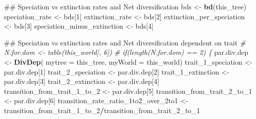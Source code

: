 \documentclass[]{book}
\newenvironment{Shaded}{\begin{snugshade}}{\end{snugshade}}
\newcommand{\KeywordTok}[1]{\textcolor[rgb]{0.13,0.29,0.53}{\textbf{{#1}}}}
\newcommand{\DataTypeTok}[1]{\textcolor[rgb]{0.13,0.29,0.53}{{#1}}}
\newcommand{\DecValTok}[1]{\textcolor[rgb]{0.00,0.00,0.81}{{#1}}}
\newcommand{\StringTok}[1]{\textcolor[rgb]{0.31,0.60,0.02}{{#1}}}
\newcommand{\CommentTok}[1]{\textcolor[rgb]{0.56,0.35,0.01}{\textit{{#1}}}}
\newcommand{\OperatorTok}[1]{\textcolor[rgb]{0.81,0.36,0.00}{\textbf{{#1}}}}
\newcommand{\NormalTok}[1]{{#1}}
\theoremstyle{definition}
\theoremstyle{definition}
\theoremstyle{remark}
\begin{document}
\begin{Shaded}
\begin{Highlighting}[]
\NormalTok{ ## Speciation vs extinction rates and Net diversification}
\NormalTok{bds <-}\StringTok{ }\KeywordTok{bd}\NormalTok{(this_tree)}
\NormalTok{speciation_rate <-}\StringTok{ }\NormalTok{bds[}\DecValTok{1}\NormalTok{]}
\NormalTok{extinction_rate <-}\StringTok{ }\NormalTok{bds[}\DecValTok{2}\NormalTok{]}
\NormalTok{extinction_per_speciation <-}\StringTok{ }\NormalTok{bds[}\DecValTok{3}\NormalTok{]}
\NormalTok{speciation_minus_extinction <-}\StringTok{ }\NormalTok{bds[}\DecValTok{4}\NormalTok{]}
\end{Highlighting}
\end{Shaded}

\begin{Shaded}
\begin{Highlighting}[]
\NormalTok{## Speciation vs extinction rates and Net diversification dependent on trait}
\CommentTok{# N.for.dom <- table(this_world[, 6])}
\CommentTok{#    if(length(N.for.dom) == 2) \{}
\NormalTok{par.div.dep <-}\StringTok{ }\KeywordTok{DivDep}\NormalTok{( }\DataTypeTok{mytree =}\NormalTok{ this_tree, }\DataTypeTok{myWorld =}\NormalTok{ this_world)}
\NormalTok{trait_1_speciation <-}\StringTok{ }\NormalTok{par.div.dep[}\DecValTok{1}\NormalTok{]}
\NormalTok{trait_2_speciation <-}\StringTok{ }\NormalTok{par.div.dep[}\DecValTok{2}\NormalTok{]}
\NormalTok{trait_1_extinction <-}\StringTok{ }\NormalTok{par.div.dep[}\DecValTok{3}\NormalTok{]}
\NormalTok{trait_2_extinction <-}\StringTok{ }\NormalTok{par.div.dep[}\DecValTok{4}\NormalTok{]}
\NormalTok{transition_from_trait_1_to_}\DecValTok{2}\NormalTok{ <-}\StringTok{ }\NormalTok{par.div.dep[}\DecValTok{5}\NormalTok{]}
\NormalTok{transition_from_trait_2_to_}\DecValTok{1}\NormalTok{ <-}\StringTok{ }\NormalTok{par.div.dep[}\DecValTok{6}\NormalTok{]}
\NormalTok{transition_rate_ratio_1to2_over_2to1 <-}\StringTok{ }\NormalTok{transition_from_trait_1_to_}\DecValTok{2}\OperatorTok{/}\NormalTok{transition_from_trait_2_to_}\DecValTok{1}
\end{Highlighting}
\end{Shaded}
\end{document}
